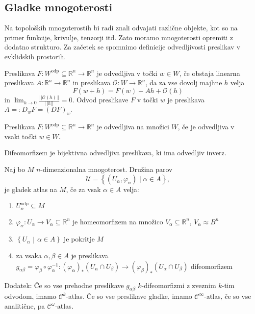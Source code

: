 \subsection{Gladke mnogoterosti}%

Na topoloških mnogoterostih bi radi znali odvajati različne objekte,
kot so na primer funkcije, krivulje, tenzorji itd. Zato moramo
mnogoterosti opremiti z dodatno strukturo. Za začetek se spomnimo
definicije odvedljivosti preslikav v evklidskih prostorih.

\begin{definicija}
Preslikava $F: W^{\text{odp}} \subseteq
\mathbb{R}^n \to \mathbb{R}^n$ je odvedljiva v točki $w \in W$, če
obstaja linearna preslikava $A : \mathbb{R}^n \to \mathbb{R}^n$ in
preslikava $\mathcal{O}: W \to \mathbb{R}^n$, da za vse dovolj majhne $h$ velja \begin{equation*} F\left( w + h \right) = F\left( w \right) + Ah
+ \mathcal{O}\left( h \right)\end{equation*} in $\lim_{h \to 0}
\frac{\lvert\lvert \mathcal{O}\left( h \right) \rvert\rvert
}{\lvert\lvert h \rvert\rvert } = 0.$ Odvod preslikave $F$ v točki $w$
je preslikava $A =: D_wF = \left( DF \right)_w.$
\end{definicija}


\begin{definicija}
\label{def_odvedljivost}
Preslikava $F: W^{\text{odp}} \subseteq  \mathbb{R}^n \to \mathbb{R}^n$ je odvedljiva
na množici $W$, če je odvedljiva v vsaki točki $w \in
W$.
\end{definicija}

\begin{definicija} \label{def_difeomorfizem} Difeomorfizem je
bijektivna odvedljiva preslikava, ki ima odvedljiv inverz. 
\end{definicija}

\begin{definicija}
\label{def_atlas}
Naj bo $M$ $n$-dimenzionalna mnogoterost. Družina parov $$\mathcal{U} = \left\{ \left( U_\alpha, \varphi_\alpha\right)
\mid \alpha \in  A \right\},$$ je gladek atlas na $M$, če za vsak $\alpha \in A$ velja:
\begin{enumerate}
 \item $U_\alpha^{\text{odp}} \subseteq M$
 \item $\varphi_\alpha: U_\alpha \to V_\alpha \subseteq \mathbb{R}^n$
je homeomorfizem na množico $V_\alpha \subseteq \mathbb{R}^n$, $V_\alpha \approx B^{n}$
 \item $\left\{ U_\alpha \middle|\, \alpha\in  A \right\}$ je
pokritje $M$ \item za vsaka $\alpha, \beta \in A$ je
preslikava $g_{\alpha \beta}  = \varphi_\beta \circ
\varphi_\alpha^{-1}: (\varphi_\alpha)_{*}(U_\alpha \cap
U_\beta) \to(\varphi_\beta)_{*}(U_\alpha \cap  U_\beta)$
difeomorfizem 
\end{enumerate}
Dodatek: Če so vse prehodne
preslikave $g_{\alpha \beta}$  $k$-difeomorfizmi z zveznim $k$-tim
odvodom, imamo $\mathcal{C}^{k}$-atlas. Če so vse preslikave gladke,
imamo $\mathcal{C}^{\infty}$-atlas, če so vse analitične, pa
$\mathcal{C}^{\omega}$-atlas.     
\end{definicija}

